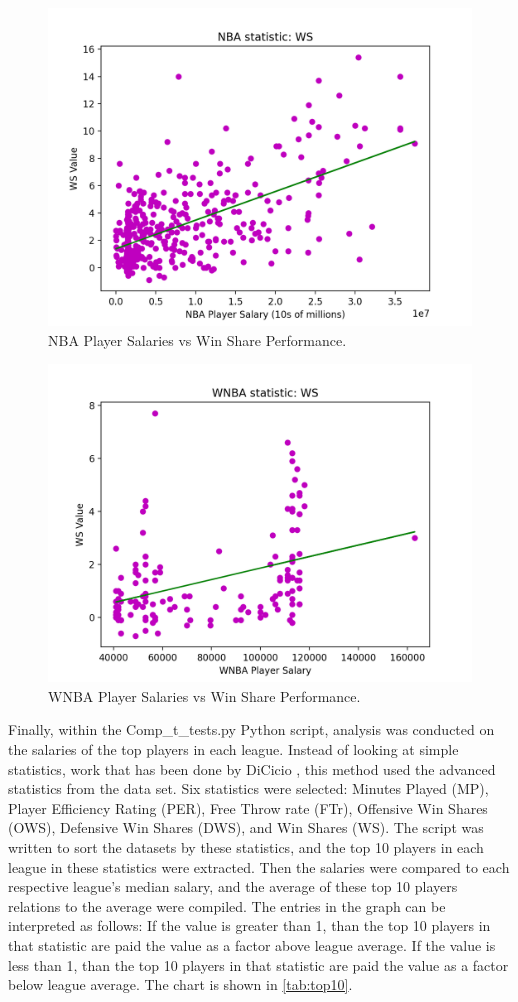 \documentclass[12pt, titlepage]{article}
\begin{document}
\begin{figure}[tbp]
  \centering
  \includegraphics[width=.75\textwidth]{NBA_WS_Graph.png}
  \caption{NBA Player Salaries vs Win Share Performance.}
  \label{fig:NBA_WS}
\end{figure}
\begin{figure}[tbp]
  \centering
  \includegraphics[width=.75\textwidth]{WNBA_WS_Graph.png}
  \caption{WNBA Player Salaries vs Win Share Performance.}
  \label{fig:WNBA_WS}
\end{figure}



\par
Finally, within the Comp\_t\_tests.py Python script, analysis was conducted on the salaries of the top players in each league. Instead of looking at 
simple statistics, work that has been done by DiCicio \citep{Hoop_Dreams}, this method used the advanced statistics from the data set. Six statistics were selected: Minutes 
Played (MP), Player Efficiency Rating (PER), Free Throw rate (FTr), Offensive Win Shares (OWS), Defensive Win Shares (DWS), and Win Shares (WS). The 
script was written to sort the datasets by these statistics, and the top 10 players in each league in these statistics were extracted. Then the salaries 
were compared to each respective league's median salary, and the average of these top 10 players relations to the average were compiled. The entries in 
the graph can be interpreted as follows: If the value is greater than 1, than the top 10 players in that statistic are paid the value as a factor above 
league average. If the value is less than 1, than the top 10 players in that statistic are paid the value as a factor below league average. The chart is 
shown in \ref{tab:top10}.
\end{document}
